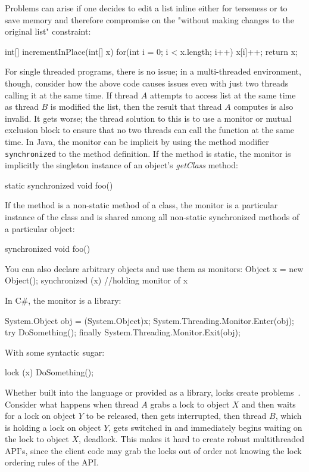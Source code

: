 Problems can arise if one decides to edit a list inline either for terseness or to save memory and therefore compromise on the 
"without making changes to the original list" constraint: 

int[] incrementInPlace(int[] x) {
	for(int i = 0; i < x.length; i++) { 
	  x[i]++;
         }
         return x;
}

For single threaded programs, there is no issue; in a multi-threaded environment, though, consider how the above code
causes issues even with just two threads calling it at the same time. 
If thread $A$ attempts to access list at the same time as thread $B$ is modified the list, then the result
that thread $A$ computes is also invalid. 
It gets worse; the thread solution to this is to use a monitor or mutual exclusion block to
ensure that no two threads can call the function at the same time. 
In Java, the monitor can be implicit by using the method modifier {\tt synchronized} to the method definition. 
If the method is static, the monitor is implicitly the singleton instance of an object's {\it getClass} method:

static synchronized void foo() { }

If the method is a non-static method of a class, the monitor is a 
particular instance of the class and is shared among all non-static synchronized methods of a particular object:

synchronized void foo() { }

You can also declare arbitrary objects and use them as monitors:
Object x = new Object();
synchronized (x) {
 //holding monitor of x
}

In C\#, the monitor is a library:
 
System.Object obj = (System.Object)x;
System.Threading.Monitor.Enter(obj);
try
{
    DoSomething();
}
finally
{
    System.Threading.Monitor.Exit(obj);
} 

With some syntactic sugar:

lock (x)
{
    DoSomething();
}

Whether built into the language or provided as a library, locks create problems~\cite{problemsWithThreads}.
Consider what happens when thread $A$ grabs a lock to object $X$ and then waits for
a lock on object $Y$ to be released, then gets interrupted, then thread $B$, which is holding a lock
on object $Y$, gets switched in and immediately begins waiting on the lock to object $X$, deadlock.
This makes it hard to create robust multithreaded API's, since the client code may grab the locks out of order not
knowing the lock ordering rules of the API. 

